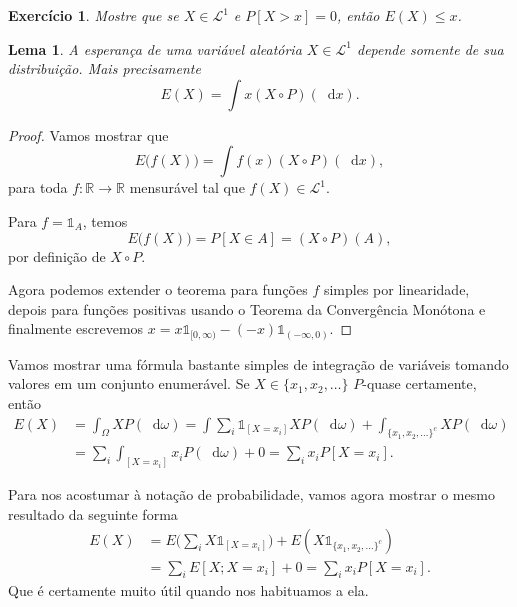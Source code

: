 \documentclass[reqno]{article}
\newcommand*\1{\mathds{1}}
\newtheorem{lemma}[theorem]{Lema}
\newtheorem{exercise}[example]{Exercício}
\renewcommand*\d{\mathop{}\!\mathrm{d}}
\begin{document}
\begin{exercise}
  Mostre que se $X \in \mathcal{L}^1$ e $P[X > x] = 0$, então $E(X) \leq x$.
\end{exercise}

\begin{lemma}
  A esperança de uma variável aleatória $X \in \mathcal{L}^1$ depende somente de sua distribuição.
  Mais precisamente
  \begin{equation}
    E(X) = \int x (X \circ P) (\d x).
  \end{equation}
\end{lemma}

\begin{proof}
  Vamos mostrar que
  \begin{equation}
    E\big(f(X)\big) = \int f(x) (X \circ P) (\d x),
  \end{equation}
  para toda $f: \mathbb{R} \to \mathbb{R}$ mensurável tal que $f(X) \in \mathcal{L}^1$.

  Para $f = \1_A$, temos
  \begin{equation}
    E\big(f(X)\big) = P[X \in A] = (X \circ P) (A),
  \end{equation}
  por definição de $X \circ P$.

  Agora podemos extender o teorema para funções $f$ simples por linearidade, depois para funções positivas usando o Teorema da Convergência Monótona e finalmente escrevemos $x = x \1_{[0, \infty)} - (-x) \1_{(-\infty,0)}$.
\end{proof}

Vamos mostrar uma fórmula bastante simples de integração de variáveis tomando valores em um conjunto enumerável.
Se $X \in \{x_1, x_2, \dots\}$ $P$-quase certamente, então
\begin{equation}
  \begin{split}
    E(X) & = \int_\Omega X P(\d \omega) = \int \sum_i \1_{[X = x_i]} X P(\d \omega) + \int_{\{x_1, x_2, \dots\}^c} X P(\d \omega)\\
    & = \sum_i \int_{[X = x_i]} x_i P(\d \omega) + 0 = \sum_i x_i P[X = x_i].
  \end{split}
\end{equation}

Para nos acostumar à notação de probabilidade, vamos agora mostrar o mesmo resultado da seguinte forma
\begin{equation}
  \begin{split}
    E(X) & = E\Big(\sum_i X \1_{[X = x_i]}\Big) + E(X \1_{\{x_1, x_2, \dots\}^c})\\
    & = \sum_i E[X; X = x_i] + 0 = \sum_i x_i P[X = x_i].
  \end{split}
\end{equation}
Que é certamente muito útil quando nos habituamos a ela.
\end{document}
